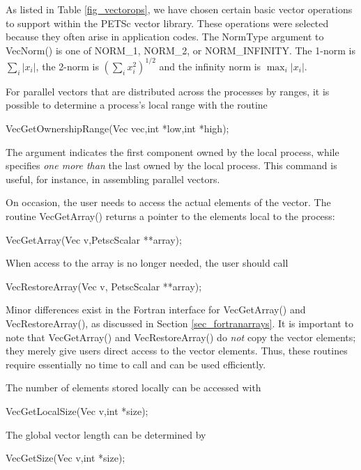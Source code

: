 As listed in Table \ref{fig_vectorops}, we have chosen certain
basic vector operations to support within the PETSc vector library.
These operations were selected because they often arise in application
codes. The NormType argument to VecNorm() is one of
NORM\_1, NORM\_2, or NORM\_INFINITY.
  The 1-norm is
$ \sum_i |x_{i}|$, the 2-norm is $( \sum_{i} x_{i}^{2})^{1/2} $ and the
infinity norm is $ \max_{i} |x_{i}|$.


For parallel vectors that are distributed across the processes by ranges,
it is possible to determine
a process's local range with the routine
\begin{tabbing}
  VecGetOwnershipRange(Vec vec,int *low,int *high);
\end{tabbing}
The argument  indicates the first component owned by the local
process, while  specifies {\em one more than} the
last owned by the local process.
This command is useful, for instance, in assembling parallel vectors.

On occasion, the user needs to access the actual elements of the vector.
The routine VecGetArray()
returns a pointer to the elements local to the process:
\begin{tabbing}
  VecGetArray(Vec v,PetscScalar **array);
\end{tabbing}
When access to the array is no longer
needed, the user should call
\begin{tabbing}
  VecRestoreArray(Vec v, PetscScalar **array);
\end{tabbing}
Minor differences exist in the Fortran interface for VecGetArray() and
VecRestoreArray(), as discussed in Section \ref{sec_fortranarrays}.
It is important to note that VecGetArray() and VecRestoreArray()
do {\em not} copy the vector elements; they merely give users direct
access to the vector elements. Thus, these routines require essentially
no time to call and can be used efficiently.

The number of elements stored locally can be accessed with
\begin{tabbing}
  VecGetLocalSize(Vec v,int *size);
\end{tabbing}
The global vector length can be determined by
\begin{tabbing}
  VecGetSize(Vec v,int *size);
\end{tabbing}


